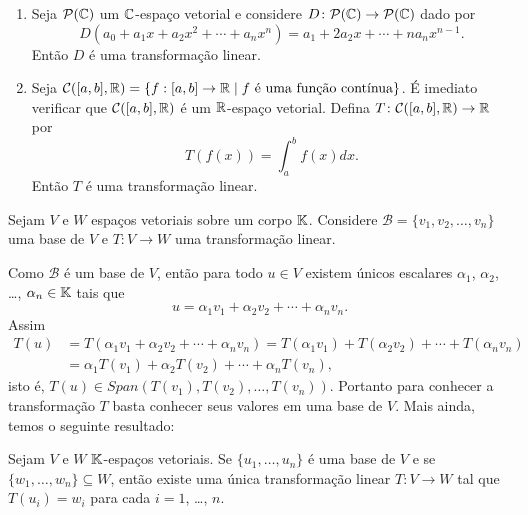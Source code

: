 \begin{exemplo}
\begin{enumerate}[label={\arabic*})]
    \item Seja $\mathcal{P}(\mathbb{C})$ um $\mathbb{C}$-espa\c{c}o vetorial e considere $D \colon \mathcal{P}(\mathbb{C}) \to \mathcal{P}(\mathbb{C})$ dado por
    \[
      D(a_0 + a_1x + a_2x^2 + \cdots + a_nx^n) = a_1 + 2a_2x + \cdots + na_nx^{n-1}.
    \]
    Ent\~ao $D$ \'e uma transforma\c{c}\~ao linear.

    \item Seja $\mathcal{C}([a,b], \real) = \{ f : [a,b] \to \real \mid f \mbox{ \'e uma fun\c{c}\~ao cont{\'\i}nua}\}$. \'E imediato verificar que $\mathcal{C}([a,b], \mathbb{R})$ \'e um $\mathbb{R}$-espa\c{c}o vetorial. Defina $T \colon \mathcal{C}([a,b], \mathbb{R}) \to \mathbb{R}$ por
    \[
      T(f(x)) = \int_a^bf(x)dx.
    \]
    Ent\~ao $T$ \'e uma transforma\c{c}\~ao linear.
  \end{enumerate}
\end{exemplo}

Sejam $V$ e $W$ espaços vetoriais sobre um corpo $\mathbb{K}$. Considere $\mathcal{B} = \{v_1, v_2, \dots, v_n\}$ uma base de $V$ e $T \colon V \to W$ uma transformação linear.

Como $\mathcal{B}$ é um base de $V$, então para todo $u \in V$ existem únicos escalares $\alpha_1$, $\alpha_2$, \dots, $\alpha_n \in \mathbb{K}$ tais que
\[
    u = \alpha_1v_1 + \alpha_2v_2 + \cdots + \alpha_nv_n.
\]
Assim
\begin{align*}
    T(u) &= T(\alpha_1v_1 + \alpha_2v_2 + \cdots + \alpha_nv_n) = T(\alpha_1v_1) + T(\alpha_2v_2) + \cdots + T(\alpha_nv_n) \\ &= \alpha_1T(v_1) + \alpha_2T(v_2) + \cdots + \alpha_nT(v_n),
\end{align*}
isto é, $T(u) \in Span(T(v_1), T(v_2), \dots, T(v_n))$. Portanto para conhecer a transformação $T$ basta conhecer seus valores em uma base de $V$. Mais ainda, temos o seguinte resultado:

\begin{teorema}\label{existencia_de_transformacao_unica_dado_valores}
  Sejam $V$ e $W$ $\mathbb{K}$-espa\c{c}os vetoriais. Se $\{u_1, \dots, u_n\}$ \'e uma base de $V$ e se $\{w_1, \dots, w_n\} \subseteq W$, ent\~ao existe uma \'unica transforma\c{c}\~ao linear $T \colon V \to W$ tal que $T(u_i) = w_i$ para cada $i = 1$, \dots, $n$.
\end{teorema}

